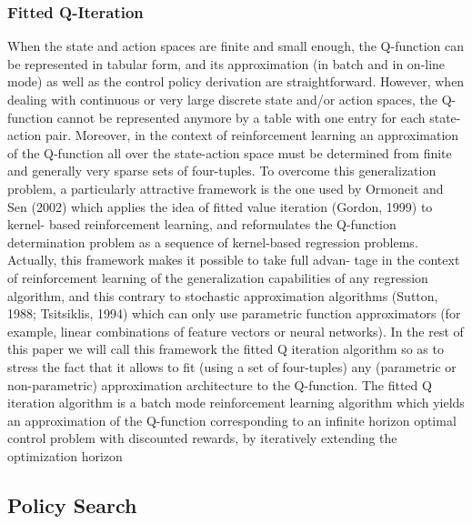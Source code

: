 \subsubsection{Fitted Q-Iteration}
When the state and action spaces are finite and small enough, the Q-function can be represented
in tabular form, and its approximation (in batch and in on-line mode) as well as the control policy
derivation are straightforward. However, when dealing with continuous or very large discrete state
and/or action spaces, the Q-function cannot be represented anymore by a table with one entry for
each state-action pair. Moreover, in the context of reinforcement learning an approximation of the
Q-function all over the state-action space must be determined from finite and generally very sparse
sets of four-tuples.
To overcome this generalization problem, a particularly attractive framework is the one used by
Ormoneit and Sen (2002) which applies the idea of fitted value iteration (Gordon, 1999) to kernel-
based reinforcement learning, and reformulates the Q-function determination problem as a sequence
of kernel-based regression problems. Actually, this framework makes it possible to take full advan-
tage in the context of reinforcement learning of the generalization capabilities of any regression
algorithm, and this contrary to stochastic approximation algorithms (Sutton, 1988; Tsitsiklis, 1994)
which can only use parametric function approximators (for example, linear combinations of feature
vectors or neural networks). In the rest of this paper we will call this framework the fitted Q iteration
algorithm so as to stress the fact that it allows to fit (using a set of four-tuples) any (parametric or
non-parametric) approximation architecture to the Q-function.
The fitted Q iteration algorithm is a batch mode reinforcement learning algorithm which yields
an approximation of the Q-function corresponding to an infinite horizon optimal control problem
with discounted rewards, by iteratively extending the optimization horizon



\subsection{Policy Search}


